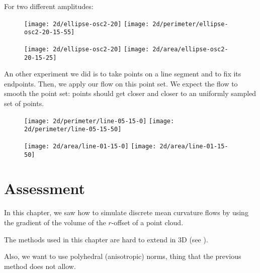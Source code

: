 For two different amplitudes:

\begin{figure}[H]
    \centering

    \texttt{[image: 2d/ellipse-osc2-20]}
    \texttt{[image: 2d/perimeter/ellipse-osc2-20-15-55]}
    \label{fig:ellipse_osc2_perimeter_flow}

    \texttt{[image: 2d/ellipse-osc2-20]}
    \texttt{[image: 2d/area/ellipse-osc2-20-15-25]}
    \label{fig:ellipse_osc2_area_flow}
\end{figure}


An other experiment we did is to take points on a line segment and to fix its
endpoints. Then, we apply our flow on this point set. We expect the flow to
smooth the point set: points should get closer and closer to an uniformly
sampled set of points.

\begin{figure}[H]
    \centering

    \texttt{[image: 2d/perimeter/line-05-15-0]}
    \texttt{[image: 2d/perimeter/line-05-15-50]}
    \label{fig:line_fixed_perimeter}

    \texttt{[image: 2d/area/line-01-15-0]}
    \texttt{[image: 2d/area/line-01-15-50]}
    \label{fig:line_fixed_area}
\end{figure}


\section{Assessment}

In this chapter, we saw how to simulate discrete mean curvature flows by using
the gradient of the volume of the $r$-offset of a point cloud.

The methods used in this chapter are hard to extend in 3D (see
\cite{cazals2011computing}).

Also, we want to use polyhedral (anisotropic) norms, thing that the previous
method does not allow.



